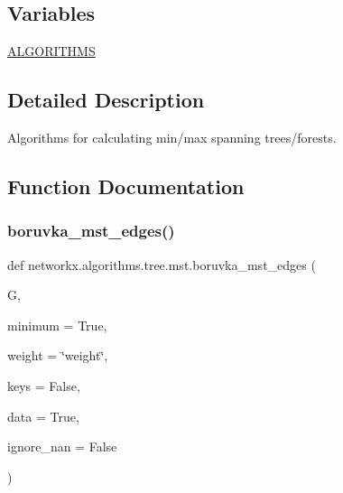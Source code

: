 \subsection*{Variables}
\begin{DoxyCompactItemize}
\item 
\hyperlink{namespacenetworkx_1_1algorithms_1_1tree_1_1mst_a96a659ccaadb2fb6d06e9c3e7e702cec}{A\+L\+G\+O\+R\+I\+T\+H\+MS}
\end{DoxyCompactItemize}


\subsection{Detailed Description}
\begin{DoxyVerb}Algorithms for calculating min/max spanning trees/forests.\end{DoxyVerb}
 

\subsection{Function Documentation}
\mbox{\label{namespacenetworkx_1_1algorithms_1_1tree_1_1mst_adc998046a90df96d250698a10380b53b}} 
\subsubsection{\texorpdfstring{boruvka\+\_\+mst\+\_\+edges()}{boruvka\_mst\_edges()}}
{\footnotesize\ttfamily def networkx.\+algorithms.\+tree.\+mst.\+boruvka\+\_\+mst\+\_\+edges (\begin{DoxyParamCaption}\item[{}]{G,  }\item[{}]{minimum = {\ttfamily True},  }\item[{}]{weight = {\ttfamily \char`\"{}weight\char`\"{}},  }\item[{}]{keys = {\ttfamily False},  }\item[{}]{data = {\ttfamily True},  }\item[{}]{ignore\+\_\+nan = {\ttfamily False} }\end{DoxyParamCaption})}

